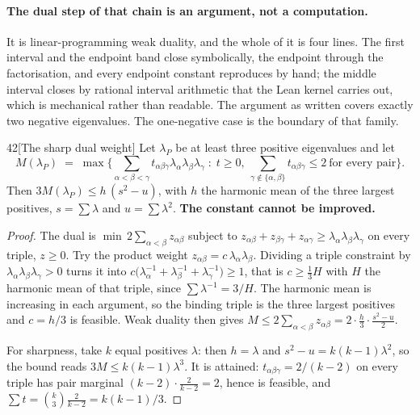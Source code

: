 \paragraph{The dual step of that chain is an argument, not a computation.} It is linear-programming weak duality, and the whole of it is four lines. The first interval and the endpoint band close symbolically, the endpoint through the factorisation, and every endpoint constant reproduces by hand; the middle interval closes by rational interval arithmetic that the Lean kernel carries out, which is mechanical rather than readable. The argument as written covers exactly two negative eigenvalues. The one-negative case is the boundary of that family.

\begin{Lem}{42}[The sharp dual weight]
Let $\lambda_P$ be at least three positive eigenvalues and let
\[
M(\lambda_P)\;=\;\max\Big\{\textstyle\sum_{\alpha<\beta<\gamma}t_{\alpha\beta\gamma}\lambda_\alpha\lambda_\beta\lambda_\gamma\;:\;t\ge0,\ \sum_{\gamma\notin\{\alpha,\beta\}}t_{\alpha\beta\gamma}\le2\ \text{for every pair}\Big\}.
\]
Then $3M(\lambda_P)\le h\,(s^2-u)$, with $h$ the harmonic mean of the three largest positives, $s=\sum\lambda$ and $u=\sum\lambda^2$. \textbf{The constant cannot be improved.}
\end{Lem}

\begin{proof}
The dual is $\min\,2\sum_{\alpha<\beta}z_{\alpha\beta}$ subject to $z_{\alpha\beta}+z_{\beta\gamma}+z_{\alpha\gamma}\ge\lambda_\alpha\lambda_\beta\lambda_\gamma$ on every triple, $z\ge0$. Try the product weight $z_{\alpha\beta}=c\,\lambda_\alpha\lambda_\beta$. Dividing a triple constraint by $\lambda_\alpha\lambda_\beta\lambda_\gamma>0$ turns it into $c\big(\lambda_\alpha^{-1}+\lambda_\beta^{-1}+\lambda_\gamma^{-1}\big)\ge1$, that is $c\ge\tfrac13H$ with $H$ the harmonic mean of that triple, since $\sum\lambda^{-1}=3/H$. The harmonic mean is increasing in each argument, so the binding triple is the three largest positives and $c=h/3$ is feasible. Weak duality then gives $M\le2\sum_{\alpha<\beta}z_{\alpha\beta}=2\cdot\tfrac h3\cdot\tfrac{s^2-u}2$.

For sharpness, take $k$ equal positives $\lambda$: then $h=\lambda$ and $s^2-u=k(k-1)\lambda^2$, so the bound reads $3M\le k(k-1)\lambda^3$. It is attained: $t_{\alpha\beta\gamma}=2/(k-2)$ on every triple has pair marginal $(k-2)\cdot\tfrac2{k-2}=2$, hence is feasible, and $\sum t=\binom k3\tfrac2{k-2}=k(k-1)/3$.
\end{proof}

